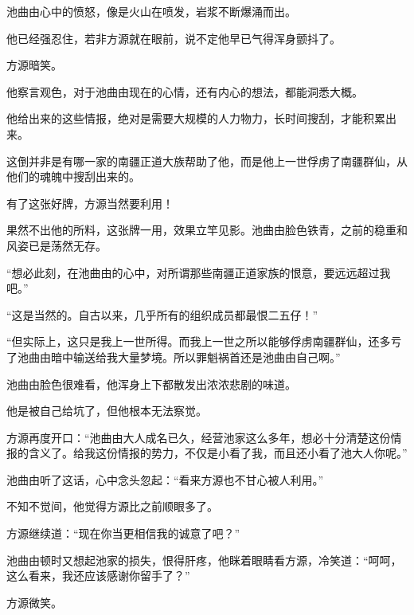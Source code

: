 \begin{this_body}
池曲由心中的愤怒，像是火山在喷发，岩浆不断爆涌而出。

他已经强忍住，若非方源就在眼前，说不定他早已气得浑身颤抖了。

方源暗笑。

他察言观色，对于池曲由现在的心情，还有内心的想法，都能洞悉大概。

他给出来的这些情报，绝对是需要大规模的人力物力，长时间搜刮，才能积累出来。

这倒并非是有哪一家的南疆正道大族帮助了他，而是他上一世俘虏了南疆群仙，从他们的魂魄中搜刮出来的。

有了这张好牌，方源当然要利用！

果然不出他的所料，这张牌一用，效果立竿见影。池曲由脸色铁青，之前的稳重和风姿已是荡然无存。

“想必此刻，在池曲由的心中，对所谓那些南疆正道家族的恨意，要远远超过我吧。”

“这是当然的。自古以来，几乎所有的组织成员都最恨二五仔！”

“但实际上，这只是我上一世所得。而我上一世之所以能够俘虏南疆群仙，还多亏了池曲由暗中输送给我大量梦境。所以罪魁祸首还是池曲由自己啊。”

池曲由脸色很难看，他浑身上下都散发出浓浓悲剧的味道。

他是被自己给坑了，但他根本无法察觉。

方源再度开口：“池曲由大人成名已久，经营池家这么多年，想必十分清楚这份情报的含义了。给我这份情报的势力，不仅是小看了我，而且还小看了池大人你呢。”

池曲由听了这话，心中念头忽起：“看来方源也不甘心被人利用。”

不知不觉间，他觉得方源比之前顺眼多了。

方源继续道：“现在你当更相信我的诚意了吧？”

池曲由顿时又想起池家的损失，恨得肝疼，他眯着眼睛看方源，冷笑道：“呵呵，这么看来，我还应该感谢你留手了？”

方源微笑。

\end{this_body}

